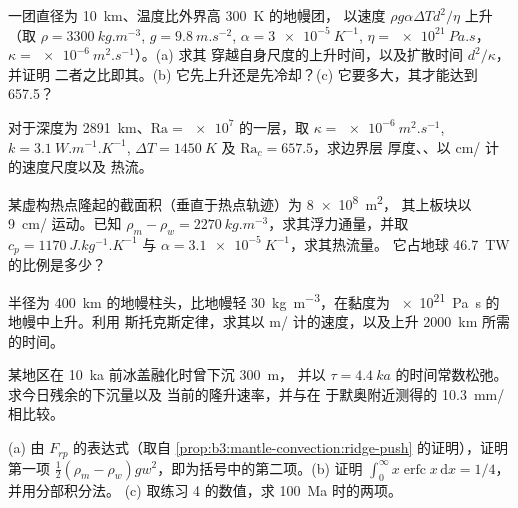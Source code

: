 \begin{exercise}[$\star\star$]\label{exo:b3:mantle-convection:5}
一团直径为 \qty{10}{km}、温度比外界高 \qty{300}{K} 的地幔团，
以速度 $\rho g\alpha\Delta Td^2/\eta$ 上升（取 $\rho =
\qty{3300}{kg.m^{-3}}$, $g = \qty{9.8}{m.s^{-2}}$, $\alpha = \qty{3e-5}{K^{-1}}$,
$\eta = \qty{e21}{Pa.s}$，$\kappa = \qty{e-6}{m^2.s^{-1}}$）。(a) 求其
穿越自身尺度的上升时间，以及扩散时间 $d^2/\kappa$，并证明
二者之比即其。(b) 它先上升还是先冷却？(c)
它要多大，其才能达到 657.5？
\end{exercise}

\begin{exercise}[$\star\star$]\label{exo:b3:mantle-convection:6}
对于深度为 \qty{2891}{km}、$\mathrm{Ra} = \num{e7}$ 的一层，取 $\kappa =
\qty{e-6}{m^2.s^{-1}}$, $k = \qty{3.1}{W.m^{-1}.K^{-1}}$, $\Delta T =
\qty{1450}{K}$ 及 $\mathrm{Ra}_c = 657.5$，求边界层
厚度、、以 \unit{cm/} 计的速度尺度以及
热流。
\end{exercise}

\begin{exercise}[$\star\star$]\label{exo:b3:mantle-convection:7}
某虚构热点隆起的截面积（垂直于热点轨迹）为 \qty{8e8}{m^2}，
其上板块以 \qty{9}{cm/} 运动。已知 $\rho_m - \rho_w =
\qty{2270}{kg.m^{-3}}$，求其浮力通量，并取 $c_p =
\qty{1170}{J.kg^{-1}.K^{-1}}$ 与 $\alpha = \qty{3.1e-5}{K^{-1}}$，求其热流量。
它占地球 \qty{46.7}{TW} 的比例是多少？
\end{exercise}

\begin{exercise}[$\star\star$]\label{exo:b3:mantle-convection:8}
半径为 \qty{400}{km} 的地幔柱头，比地幔轻
\qty{30}{kg.m^{-3}}，在黏度为 \qty{e21}{Pa.s} 的地幔中上升。利用
斯托克斯定律，求其以 \unit{m/} 计的速度，以及上升
\qty{2000}{km} 所需的时间。
\end{exercise}

\begin{exercise}[$\star\star$]\label{exo:b3:mantle-convection:9}
某地区在 \qty{10}{ka} 前冰盖融化时曾下沉 \qty{300}{m}，
并以 $\tau = \qty{4.4}{ka}$ 的时间常数松弛。求今日残余的下沉量以及
当前的隆升速率，并与在
于默奥附近测得的 \qty{10.3}{mm/} 相比较。
\end{exercise}

\begin{exercise}[$\star\star\star$]\label{exo:b3:mantle-convection:10}
(a) 由 $F_{rp}$ 的表达式（取自
\cref{prop:b3:mantle-convection:ridge-push} 的证明），证明第一项
$\tfrac12(\rho_m - \rho_w)gw^2$，即为括号中的第二项。(b) 证明
$\int_0^\infty x\operatorname{erfc}x\,\mathrm dx = 1/4$，并用分部积分法。
(c) 取练习 4 的数值，求 \qty{100}{Ma} 时的两项。
\end{exercise}


